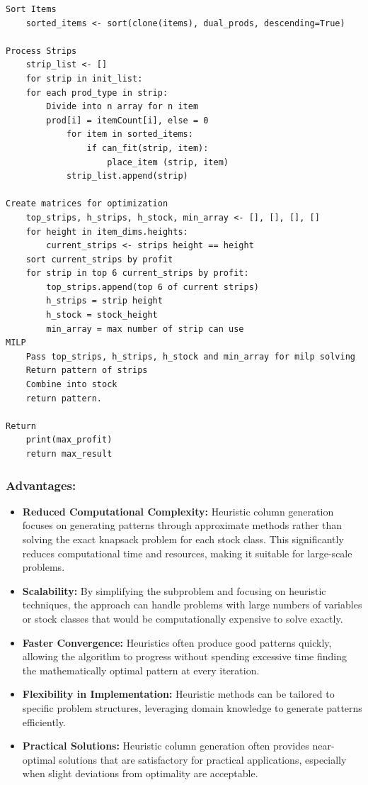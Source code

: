 \documentclass[a4paper]{article}
\begin{document}
\begin{itemize}
\begin{itemize}
\begin{verbatim}
Sort Items
    sorted_items <- sort(clone(items), dual_prods, descending=True)

Process Strips
    strip_list <- []
    for strip in init_list:
	for each prod_type in strip:
	    Divide into n array for n item
	    prod[i] = itemCount[i], else = 0
            for item in sorted_items:
                if can_fit(strip, item):
                    place_item (strip, item)
            strip_list.append(strip)

Create matrices for optimization
    top_strips, h_strips, h_stock, min_array <- [], [], [], []
    for height in item_dims.heights:
    	current_strips <- strips height == height
	sort current_strips by profit
	for strip in top 6 current_strips by profit:
	    top_strips.append(top 6 of current strips) 
	    h_strips = strip height
	    h_stock = stock_height
	    min_array = max number of strip can use
MILP
    Pass top_strips, h_strips, h_stock and min_array for milp solving
    Return pattern of strips
    Combine into stock
    return pattern.

Return
    print(max_profit)
    return max_result
\end{verbatim}
\end{itemize}
\end{itemize}

\vspace{0.25cm}

\subsubsection*{Advantages:}
\begin{itemize}
    \item \textbf{Reduced Computational Complexity:} Heuristic column generation focuses on generating patterns through approximate methods rather than solving the exact knapsack problem for each stock class. This significantly reduces computational time and resources, making it suitable for large-scale problems.
    \item \textbf{Scalability:} By simplifying the subproblem and focusing on heuristic techniques, the approach can handle problems with large numbers of variables or stock classes that would be computationally expensive to solve exactly.
    \item \textbf{Faster Convergence:} Heuristics often produce good patterns quickly, allowing the algorithm to progress without spending excessive time finding the mathematically optimal pattern at every iteration.
    \item \textbf{Flexibility in Implementation:} Heuristic methods can be tailored to specific problem structures, leveraging domain knowledge to generate patterns efficiently.
    \item \textbf{Practical Solutions:} Heuristic column generation often provides near-optimal solutions that are satisfactory for practical applications, especially when slight deviations from optimality are acceptable.
\end{itemize}
\end{document}
